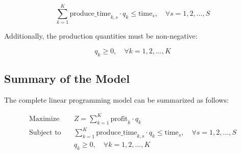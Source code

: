 \documentclass{article}
\begin{document}
\[
\sum_{k=1}^{K} \text{produce\_time}_{k,s} \cdot q_{k} \leq \text{time}_{s}, \quad \forall s = 1, 2, \ldots, S
\]

Additionally, the production quantities must be non-negative:

\[
q_{k} \geq 0, \quad \forall k = 1, 2, \ldots, K
\]

\subsection*{Summary of the Model}
The complete linear programming model can be summarized as follows:

\begin{align*}
\text{Maximize} \quad & Z = \sum_{k=1}^{K} \text{profit}_{k} \cdot q_{k} \\
\text{Subject to} \quad & \sum_{k=1}^{K} \text{produce\_time}_{k,s} \cdot q_{k} \leq \text{time}_{s}, \quad \forall s = 1, 2, \ldots, S \\
& q_{k} \geq 0, \quad \forall k = 1, 2, \ldots, K
\end{align*}
\end{document}
